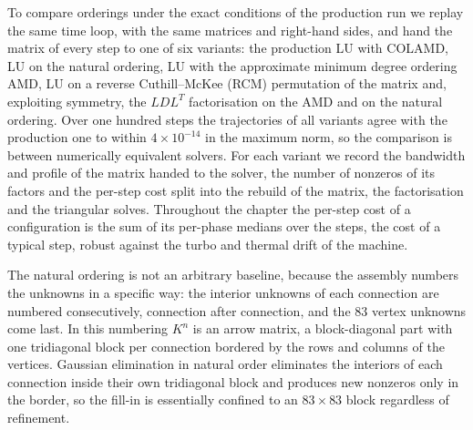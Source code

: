 \documentclass[11pt,a4paper]{article}
\begin{document}
To compare orderings under the exact conditions of the production run we
replay the same time loop, with the same matrices and right-hand sides, and
hand the matrix of every step to one of six variants: the production LU
with COLAMD, LU on the natural ordering, LU with the approximate minimum
degree ordering AMD, LU on a reverse Cuthill--McKee (RCM)
permutation of the matrix and, exploiting symmetry, the $LDL^{T}$
factorisation on the AMD and on the natural ordering. Over one hundred
steps the trajectories of all variants agree with the production one to
within $4\times10^{-14}$ in the maximum norm, so the comparison is between
numerically equivalent solvers. For each variant we record the bandwidth
and profile of the matrix handed to the solver, the number of nonzeros of
its factors and the per-step cost split into the rebuild of the matrix, the
factorisation and the triangular solves. Throughout the chapter the
per-step cost of a configuration is the sum of its per-phase medians over
the steps, the cost of a typical step, robust against the turbo and
thermal drift of the machine.

The natural ordering is not an arbitrary baseline, because the assembly
numbers the unknowns in a specific way: the interior unknowns of each
connection are numbered consecutively, connection after connection, and the
83 vertex unknowns come last. In this numbering $K^{n}$ is an arrow matrix,
a block-diagonal part with one tridiagonal block per connection bordered by
the rows and columns of the vertices. Gaussian elimination in natural order
eliminates the interiors of each connection inside their own tridiagonal
block and produces new nonzeros only in the border, so the fill-in is
essentially confined to an $83\times 83$ block regardless of refinement.
\end{document}
